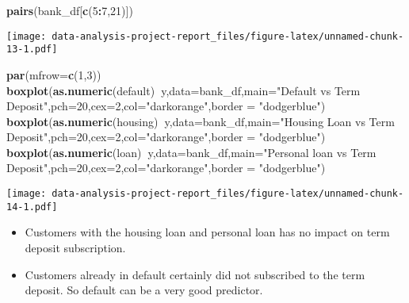 \documentclass[
]{article}
\newenvironment{Shaded}{\begin{snugshade}}{\end{snugshade}}
\newcommand{\DataTypeTok}[1]{\textcolor[rgb]{0.13,0.29,0.53}{#1}}
\newcommand{\DecValTok}[1]{\textcolor[rgb]{0.00,0.00,0.81}{#1}}
\newcommand{\KeywordTok}[1]{\textcolor[rgb]{0.13,0.29,0.53}{\textbf{#1}}}
\newcommand{\NormalTok}[1]{#1}
\newcommand{\OperatorTok}[1]{\textcolor[rgb]{0.81,0.36,0.00}{\textbf{#1}}}
\newcommand{\StringTok}[1]{\textcolor[rgb]{0.31,0.60,0.02}{#1}}
\providecommand{\tightlist}{%
  \setlength{\itemsep}{0pt}\setlength{\parskip}{0pt}}
\begin{document}
\begin{Shaded}
\begin{Highlighting}[]
\KeywordTok{pairs}\NormalTok{(bank_df[}\KeywordTok{c}\NormalTok{(}\DecValTok{5}\OperatorTok{:}\DecValTok{7}\NormalTok{,}\DecValTok{21}\NormalTok{)])}
\end{Highlighting}
\end{Shaded}

\texttt{[image: data-analysis-project-report\_files/figure-latex/unnamed-chunk-13-1.pdf]}

\begin{Shaded}
\begin{Highlighting}[]
\KeywordTok{par}\NormalTok{(}\DataTypeTok{mfrow=}\KeywordTok{c}\NormalTok{(}\DecValTok{1}\NormalTok{,}\DecValTok{3}\NormalTok{))}
\KeywordTok{boxplot}\NormalTok{(}\KeywordTok{as.numeric}\NormalTok{(default)}\OperatorTok{~}\NormalTok{y,}\DataTypeTok{data=}\NormalTok{bank_df,}\DataTypeTok{main=}\StringTok{"Default vs Term Deposit"}\NormalTok{,}\DataTypeTok{pch=}\DecValTok{20}\NormalTok{,}\DataTypeTok{cex=}\DecValTok{2}\NormalTok{,}\DataTypeTok{col=}\StringTok{"darkorange"}\NormalTok{,}\DataTypeTok{border =} \StringTok{"dodgerblue"}\NormalTok{)}
\KeywordTok{boxplot}\NormalTok{(}\KeywordTok{as.numeric}\NormalTok{(housing)}\OperatorTok{~}\NormalTok{y,}\DataTypeTok{data=}\NormalTok{bank_df,}\DataTypeTok{main=}\StringTok{"Housing Loan vs Term Deposit"}\NormalTok{,}\DataTypeTok{pch=}\DecValTok{20}\NormalTok{,}\DataTypeTok{cex=}\DecValTok{2}\NormalTok{,}\DataTypeTok{col=}\StringTok{"darkorange"}\NormalTok{,}\DataTypeTok{border =} \StringTok{"dodgerblue"}\NormalTok{)}
\KeywordTok{boxplot}\NormalTok{(}\KeywordTok{as.numeric}\NormalTok{(loan)}\OperatorTok{~}\NormalTok{y,}\DataTypeTok{data=}\NormalTok{bank_df,}\DataTypeTok{main=}\StringTok{"Personal loan vs Term Deposit"}\NormalTok{,}\DataTypeTok{pch=}\DecValTok{20}\NormalTok{,}\DataTypeTok{cex=}\DecValTok{2}\NormalTok{,}\DataTypeTok{col=}\StringTok{"darkorange"}\NormalTok{,}\DataTypeTok{border =} \StringTok{"dodgerblue"}\NormalTok{)}
\end{Highlighting}
\end{Shaded}

\texttt{[image: data-analysis-project-report\_files/figure-latex/unnamed-chunk-14-1.pdf]}

\begin{itemize}
\tightlist
\item
  Customers with the housing loan and personal loan has no impact on
  term deposit subscription.
\item
  Customers already in default certainly did not subscribed to the term
  deposit. So default can be a very good predictor.
\end{itemize}
\end{document}
